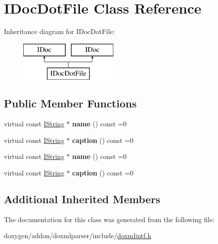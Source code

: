 \hypertarget{class_i_doc_dot_file}{}\section{I\+Doc\+Dot\+File Class Reference}
\label{class_i_doc_dot_file}
Inheritance diagram for I\+Doc\+Dot\+File\+:\begin{figure}[H]
\begin{center}
\leavevmode
\includegraphics[height=2.000000cm]{class_i_doc_dot_file}
\end{center}
\end{figure}
\subsection*{Public Member Functions}
\begin{DoxyCompactItemize}
\item 
\mbox{\label{class_i_doc_dot_file_ac22076dc89904e1670782b1787c2a5ab}} 
virtual const \mbox{\hyperlink{class_i_string}{I\+String}} $\ast$ {\bfseries name} () const =0
\item 
\mbox{\label{class_i_doc_dot_file_a35b3c86d0bcb57ad3c0acb78cd940d5b}} 
virtual const \mbox{\hyperlink{class_i_string}{I\+String}} $\ast$ {\bfseries caption} () const =0
\item 
\mbox{\label{class_i_doc_dot_file_ac22076dc89904e1670782b1787c2a5ab}} 
virtual const \mbox{\hyperlink{class_i_string}{I\+String}} $\ast$ {\bfseries name} () const =0
\item 
\mbox{\label{class_i_doc_dot_file_a35b3c86d0bcb57ad3c0acb78cd940d5b}} 
virtual const \mbox{\hyperlink{class_i_string}{I\+String}} $\ast$ {\bfseries caption} () const =0
\end{DoxyCompactItemize}
\subsection*{Additional Inherited Members}


The documentation for this class was generated from the following file\+:\begin{DoxyCompactItemize}
\item 
doxygen/addon/doxmlparser/include/\mbox{\hyperlink{include_2doxmlintf_8h}{doxmlintf.\+h}}\end{DoxyCompactItemize}
